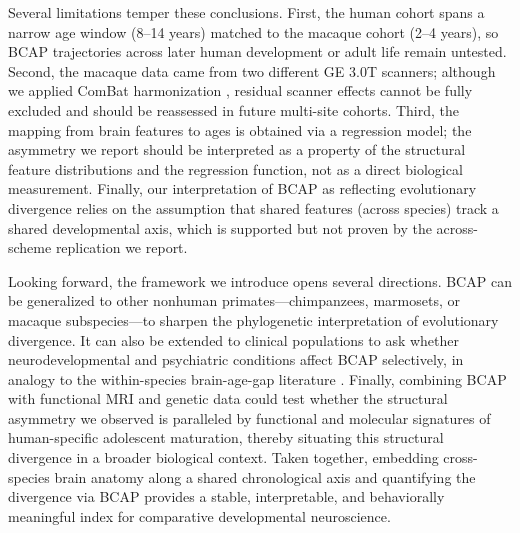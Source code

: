 \documentclass[11pt]{article}
\begin{document}
Several limitations temper these conclusions. First, the human cohort spans a narrow age window (8--14 years) matched to the macaque cohort (2--4 years), so BCAP trajectories across later human development or adult life remain untested. Second, the macaque data came from two different GE 3.0T scanners; although we applied ComBat harmonization \citep{fortin2017harmonization_dti, johnson2007adjusting}, residual scanner effects cannot be fully excluded and should be reassessed in future multi-site cohorts. Third, the mapping from brain features to ages is obtained via a regression model; the asymmetry we report should be interpreted as a property of the structural feature distributions and the regression function, not as a direct biological measurement. Finally, our interpretation of BCAP as reflecting evolutionary divergence relies on the assumption that shared features (across species) track a shared developmental axis, which is supported but not proven by the across-scheme replication we report.

Looking forward, the framework we introduce opens several directions. BCAP can be generalized to other nonhuman primates---chimpanzees, marmosets, or macaque subspecies---to sharpen the phylogenetic interpretation of evolutionary divergence. It can also be extended to clinical populations to ask whether neurodevelopmental and psychiatric conditions affect BCAP selectively, in analogy to the within-species brain-age-gap literature \citep{cole2017predicting, hajek2019brain, mcwhinney2021obesity}. Finally, combining BCAP with functional MRI and genetic data could test whether the structural asymmetry we observed is paralleled by functional and molecular signatures of human-specific adolescent maturation, thereby situating this structural divergence in a broader biological context. Taken together, embedding cross-species brain anatomy along a shared chronological axis and quantifying the divergence via BCAP provides a stable, interpretable, and behaviorally meaningful index for comparative developmental neuroscience.


\end{document}
